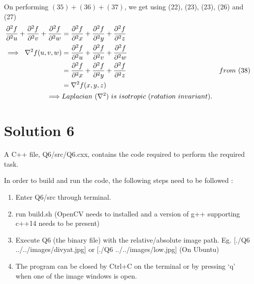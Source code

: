 \documentclass[a4paper,fleqn,11pt]{article}
\theoremstyle{mytheor}
\begin{document}
On performing $(35) + (36) + (37)$, we get using (22), (23), (23), (26) and (27)
\begin{align}
\frac{\partial^2 f}{\partial^2 u} +
\frac{\partial^2 f}{\partial^2 v} +
\frac{\partial^2 f}{\partial^2 w} & =
\frac{\partial^2 f}{\partial^2 x} +
\frac{\partial^2 f}{\partial^2 y} +
\frac{\partial^2 f}{\partial^2 z}\\
\implies\ \nabla^2 f(u, v, w) & = \frac{\partial^2 f}{\partial^2 u} +
							  \frac{\partial^2 f}{\partial^2 v} +
						      \frac{\partial^2 f}{\partial^2 w} \\
						      & = \frac{\partial^2 f}{\partial^2 x} +
							  \frac{\partial^2 f}{\partial^2 y} +
						      \frac{\partial^2 f}{\partial^2 z} & from\ (38) \\
						      & =  \nabla^2 f(x, y, z) \\
\implies & Laplacian\ (\nabla^2)\ is\ isotropic\ (rotation\ invariant). \notag
\end{align}

\section*{Solution 6}
A C++ file, Q6/src/Q6.cxx, contains the code required to perform the required task.

In order to build and run the code, the following steps need to be followed :
\begin{enumerate}
\item Enter Q6/src through terminal.
\item run build.sh (OpenCV needs to installed and a version of g++ supporting c++14 needs to be present)
\item Execute Q6 (the binary file) with the relative/absolute image path. Eg. [./Q6 ../../images/divyat.jpg] or [./Q6 ../../images/low.jpg] (On Ubuntu)
\item The program can be closed by Ctrl+C on the terminal or by pressing `q' when one of the image windows is open.
\end{enumerate}
\pagebreak
\end{document}
